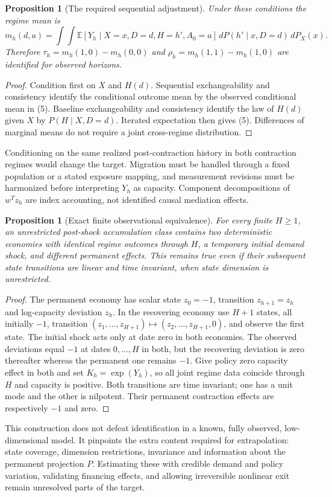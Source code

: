 \documentclass[11pt]{article}
\newtheorem{proposition}[theorem]{Proposition}
\theoremstyle{remark}
\newcommand{\E}{\mathbb E}
\begin{document}
\begin{proposition}[The required sequential adjustment]
Under these conditions the regime mean is
\[
 m_h(d,a)=\int\!\int
 \E[Y_h\mid X=x,D=d,H=h',A_0=a]\,
 dP(h'\mid x,D=d)\,dP_X(x).                                      \tag{5}
\]
Therefore $\tau_h=m_h(1,0)-m_h(0,0)$ and
$\rho_h=m_h(1,1)-m_h(1,0)$ are identified for observed horizons.
\end{proposition}
\begin{proof}
Condition first on $X$ and $H(d)$. Sequential exchangeability and
consistency identify the conditional outcome mean by the observed
conditional mean in (5). Baseline exchangeability and consistency identify
the law of $H(d)$ given $X$ by $P(H\mid X,D=d)$. Iterated expectation
then gives (5). Differences of marginal means do not require a joint
cross-regime distribution.
\end{proof}
Conditioning on the same realized post-contraction history in both
contraction regimes would change the target. Migration must be handled
through a fixed population or a stated exposure mapping, and measurement
revisions must be harmonized before interpreting $Y_h$ as capacity.
Component decompositions of $w^Tz_h$ are index accounting, not identified
causal mediation effects.

\begin{proposition}[Exact finite observational equivalence]
For every finite $H\geq1$, an unrestricted post-shock accumulation class
contains two deterministic economies with identical regime outcomes through
$H$, a temporary initial demand shock, and different permanent effects.
This remains true even if their subsequent state transitions are linear
and time invariant, when state dimension is unrestricted.
\end{proposition}
\begin{proof}
The permanent economy has scalar state $z_0=-1$, transition $z_{h+1}=z_h$
and log-capacity deviation $z_h$. In the recovering economy use $H+1$
states, all initially $-1$, transition
$(z_1,\ldots,z_{H+1})\mapsto(z_2,\ldots,z_{H+1},0)$, and observe the
first state. The initial shock acts only at date zero in both economies.
The observed deviations equal $-1$ at dates $0,\ldots,H$ in both,
but the recovering deviation is zero thereafter whereas the permanent
one remains $-1$. Give policy zero capacity effect in both and set
$K_h=\exp(Y_h)$, so all joint regime data coincide through $H$ and
capacity is positive. Both transitions are time invariant; one has a
unit mode and the other is nilpotent. Their permanent contraction effects
are respectively $-1$ and zero.
\end{proof}
This construction does not defeat identification in a known, fully
observed, low-dimensional model. It pinpoints the extra content required
for extrapolation: state coverage, dimension restrictions, invariance and
information about the permanent projection $P$. Estimating these with
credible demand and policy variation, validating financing effects, and
allowing irreversible nonlinear exit remain unresolved parts of the target.
\end{document}
